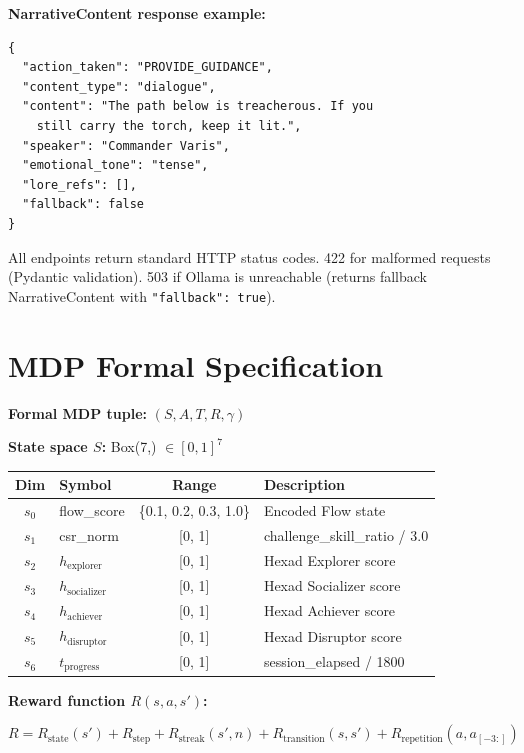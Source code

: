 \textbf{NarrativeContent response example:}

\begin{lstlisting}[language={}]
{
  "action_taken": "PROVIDE_GUIDANCE",
  "content_type": "dialogue",
  "content": "The path below is treacherous. If you
    still carry the torch, keep it lit.",
  "speaker": "Commander Varis",
  "emotional_tone": "tense",
  "lore_refs": [],
  "fallback": false
}
\end{lstlisting}

All endpoints return standard HTTP status codes. 422 for malformed requests (Pydantic validation). 503 if Ollama is unreachable (returns fallback NarrativeContent with \texttt{"fallback": true}).


\chapter{MDP Formal Specification}
\label{app:mdp}

\textbf{Formal MDP tuple:} $(S, A, T, R, \gamma)$

\textbf{State space $S$:} Box(7,) $\in [0, 1]^7$

\begin{table}[H]
\centering
\small
\begin{tabular}{@{}clcl@{}}
\toprule
\textbf{Dim} & \textbf{Symbol} & \textbf{Range} & \textbf{Description} \\
\midrule
$s_0$ & flow\_score & \{0.1, 0.2, 0.3, 1.0\} & Encoded Flow state \\
$s_1$ & csr\_norm & [0, 1] & challenge\_skill\_ratio / 3.0 \\
$s_2$ & $h_{\text{explorer}}$ & [0, 1] & Hexad Explorer score \\
$s_3$ & $h_{\text{socializer}}$ & [0, 1] & Hexad Socializer score \\
$s_4$ & $h_{\text{achiever}}$ & [0, 1] & Hexad Achiever score \\
$s_5$ & $h_{\text{disruptor}}$ & [0, 1] & Hexad Disruptor score \\
$s_6$ & $t_{\text{progress}}$ & [0, 1] & session\_elapsed / 1800 \\
\bottomrule
\end{tabular}
\end{table}

\textbf{Reward function $R(s, a, s')$:}

\[
R = R_{\text{state}}(s') + R_{\text{step}} + R_{\text{streak}}(s', n) + R_{\text{transition}}(s, s') + R_{\text{repetition}}(a, a_{[-3:]})
\]

